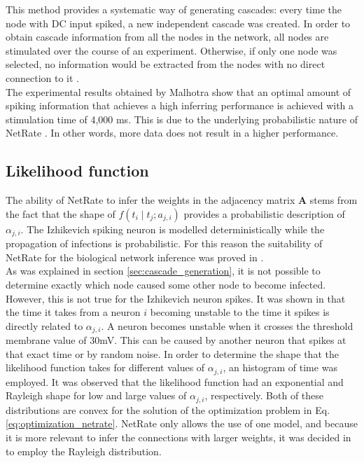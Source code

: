 This method provides a systematic way of generating cascades: every time the node with DC input spiked, a new independent cascade was created. In order to obtain cascade information from all the nodes in the network, all nodes are stimulated over the course of an experiment. Otherwise, if only one node was selected, no information would be extracted from the nodes with no direct connection to it \cite{pranav_report}. \\

The experimental results obtained by Malhotra show that an optimal amount of spiking information that achieves a high inferring performance is achieved with a stimulation time of 4,000 ms. This is due to the underlying probabilistic nature of NetRate \cite{pranav_report}. In other words, more data does not result in a higher performance.

\subsection{Likelihood function}

The ability of NetRate to infer the weights in the adjacency matrix \textbf{A} stems from the fact that the shape of $f(t_{i}\mid t_{j};a_{j,i})$ provides a probabilistic description of $\alpha_{j,i}$. The Izhikevich spiking neuron is modelled deterministically while the propagation of infections is probabilistic. For this reason the suitability of NetRate for the biological network inference was proved in \cite{alexandru2018estimating}.\\

As was explained in section \ref{sec:cascade_generation}, it is not possible to determine exactly which node caused some other node to become infected. However, this is not true for the Izhikevich neuron spikes. It was shown in \cite{alexandru2018estimating} that the time it takes from a neuron $i$ becoming unstable to the time it spikes is directly related to $\alpha_{j,i}$. A neuron becomes unstable when it crosses the threshold membrane value of 30mV. This can be caused by another neuron that spikes at that exact time or by random noise. In order to determine the shape that the likelihood function takes for different values of $\alpha_{j,i}$, an histogram of time was employed. It was observed that the likelihood function had an exponential and Rayleigh shape for low and large values of $\alpha_{j,i}$, respectively. Both of these distributions are convex for the solution of the optimization problem in Eq.\ref{eq:optimization_netrate}. NetRate only allows the use of one model, and because it is more relevant to infer the connections with larger weights, it was decided in \cite{alexandru2018estimating} to employ the Rayleigh distribution. 

